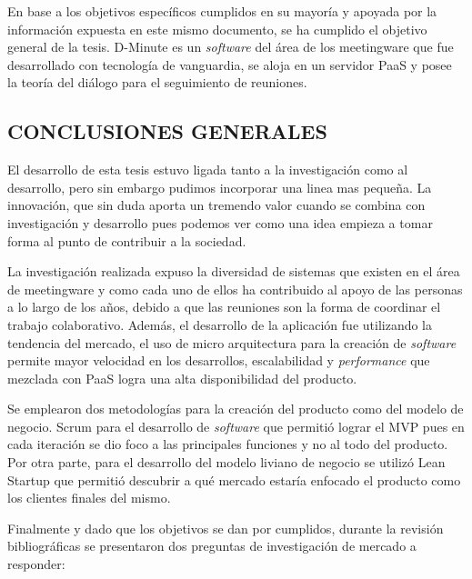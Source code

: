 En base a los objetivos específicos cumplidos en su mayoría y apoyada por la información expuesta en este mismo documento, se ha cumplido el objetivo general de la tesis. D-Minute es un \textit{software} del área de los meetingware que fue desarrollado con tecnología de vanguardia, se aloja en un servidor PaaS y posee la teoría del diálogo para el seguimiento de reuniones. 

\subsection{CONCLUSIONES GENERALES}

El desarrollo de esta tesis estuvo ligada tanto a la investigación como al desarrollo, pero sin embargo pudimos incorporar una linea mas pequeña. La innovación, que sin duda aporta un tremendo valor cuando se combina con investigación y desarrollo pues podemos ver como una idea empieza a tomar forma al punto de contribuir a la sociedad.

La investigación realizada expuso la diversidad de sistemas que existen en el área de meetingware y como cada uno de ellos ha contribuido al apoyo de las personas a lo largo de los años, debido a que las reuniones son la forma de coordinar el trabajo colaborativo. Además, el desarrollo de la aplicación fue utilizando la tendencia del mercado, el uso de micro arquitectura para la creación de \textit{software} permite mayor velocidad en los desarrollos, escalabilidad y \textit{performance} que mezclada con PaaS logra una alta disponibilidad del producto.

Se emplearon dos metodologías para la creación del producto como del modelo de negocio. Scrum para el desarrollo de \textit{software} que permitió lograr el MVP pues en cada iteración se dio foco a las principales funciones y no al todo del producto. Por otra parte, para el desarrollo del modelo liviano de negocio se utilizó Lean Startup que permitió descubrir a qué mercado estaría enfocado el producto como los clientes finales del mismo.

Finalmente y dado que los objetivos se dan por cumplidos, durante la revisión bibliográficas se presentaron dos preguntas de investigación de mercado a responder:

